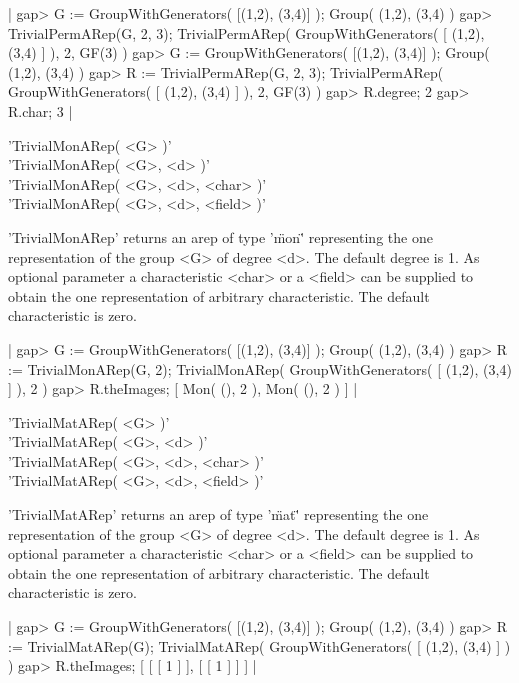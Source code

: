 |    gap> G := GroupWithGenerators( [(1,2), (3,4)] ); 
    Group( (1,2), (3,4) )
    gap> TrivialPermARep(G, 2, 3);
    TrivialPermARep( GroupWithGenerators( [ (1,2), (3,4) ] ), 2, GF(3) )
    gap> G := GroupWithGenerators( [(1,2), (3,4)] );
    Group( (1,2), (3,4) )
    gap> R := TrivialPermARep(G, 2, 3);
    TrivialPermARep( GroupWithGenerators( [ (1,2), (3,4) ] ), 2, GF(3) )
    gap> R.degree;
    2
    gap> R.char;
    3 |


'TrivialMonARep( <G> )'\\
'TrivialMonARep( <G>, <d> )'\\
'TrivialMonARep( <G>, <d>, <char> )'\\
'TrivialMonARep( <G>, <d>, <field> )'

'TrivialMonARep' returns an arep of type '\"mon\"' representing 
the one representation of the group <G> of degree <d>. The default
degree is 1.
As optional parameter a characteristic <char> or a <field> 
can be supplied to obtain the one representation of arbitrary 
characteristic. The default characteristic is zero.

|    gap> G := GroupWithGenerators( [(1,2), (3,4)] );
    Group( (1,2), (3,4) )
    gap> R := TrivialMonARep(G, 2);    
    TrivialMonARep( GroupWithGenerators( [ (1,2), (3,4) ] ), 2 )
    gap> R.theImages;
    [ Mon( (), 2 ), Mon( (), 2 ) ] |


'TrivialMatARep( <G> )'\\
'TrivialMatARep( <G>, <d> )'\\
'TrivialMatARep( <G>, <d>, <char> )'\\
'TrivialMatARep( <G>, <d>, <field> )'

'TrivialMatARep' returns an arep of type '\"mat\"' representing 
the one representation of the group <G> of degree <d>. The default
degree is 1.
As optional parameter a characteristic <char> or a <field> 
can be supplied to obtain the one representation of arbitrary 
characteristic. The default characteristic is zero.

|    gap> G := GroupWithGenerators( [(1,2), (3,4)] );
    Group( (1,2), (3,4) )
    gap> R := TrivialMatARep(G);   
    TrivialMatARep( GroupWithGenerators( [ (1,2), (3,4) ] ) )
    gap> R.theImages;
    [ [ [ 1 ] ], [ [ 1 ] ] ] |

